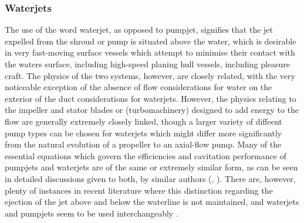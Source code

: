 \documentclass{article}\usepackage[]{graphicx}\usepackage[]{color}
\begin{document}
\subsubsection{Waterjets}
The use of the word waterjet, as opposed to pumpjet, signifies that the jet expelled from the shroud or pump is situated above the water, which is desirable in very fast-moving surface vessels which attempt to minimise their contact with the waters surface, including high-speed planing hull vessels, including pleasure craft.  The physics of the two systems, however, are closely related, with the very noticeable exception of the absence of flow considerations for water on the exterior of the duct considerations for waterjets.  However, the physics relating to the impeller and stator blades or (turbomachinery) designed to add energy to the flow are generally extremely closely linked, though a larger variety of diffeent pump types can be chosen for waterjets which might differ more significantly from the natural evolution of a propeller to an axial-flow pump. Many of the essential equations which govern the efficiencies and cavitation performance of pumpjets and waterjets are of the same or extremely similar form, as can be seen in detailed discussions given to both, by similar authors (\cite{wislicenus1973}, \cite{henderson1964}).  There are, however, plenty of instances in recent literature where this distinction regarding the ejection of the jet above and below the waterline is not maintained, and waterjets and pumpjets seem to be used interchangeably \parencite{abdel2010}.
\end{document}
